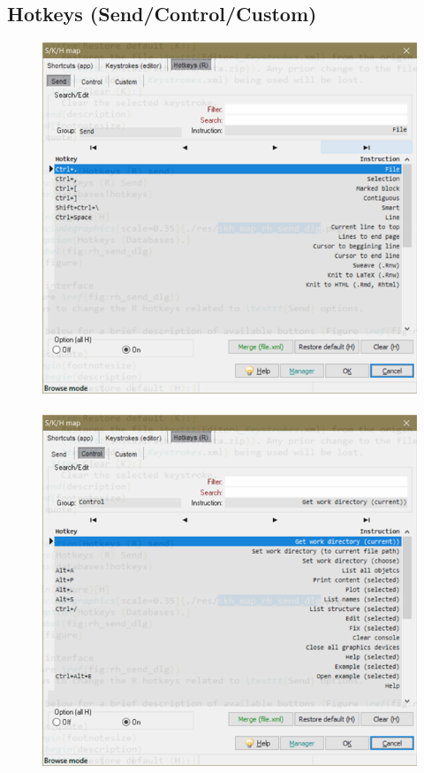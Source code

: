 \hypertarget{dlg_hotkeys_editor}{}
\subsection{Hotkeys (Send/Control/Custom)}

\begin{figure}[H]
  \includegraphics[scale=0.35]{./res/dlg_skh_map_rh_send.png}~~
  \includegraphics[scale=0.35]{./res/dlg_skh_map_rh_control.png}~~

\end{figure}

